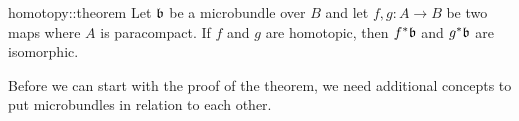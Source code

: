 \begin{mytheorem}{homotopy::theorem}%
    Let $\mathfrak{b}$ be a microbundle over $B$ and let $f, g: A \to B$ be two maps where $A$ is paracompact.
    If $f$ and $g$ are homotopic, then $f^*\mathfrak{b}$ and $g^*\mathfrak{b}$ are isomorphic.
\end{mytheorem}

\begin{myparagraph}
    Before we can start with the proof of the theorem,
    we need additional concepts to put microbundles in relation to each other.
\end{myparagraph}